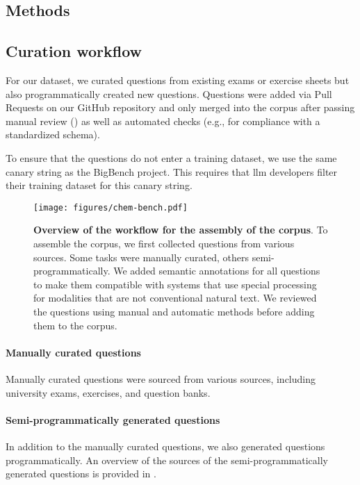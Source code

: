 \documentclass[11pt, oneside]{article}
\begin{document}
\begin{refsection}
\clearpage

\section{Methods}

\subsection{Curation workflow}\label{sec:curation}
For our dataset, we curated questions from existing exams or exercise sheets but also programmatically created new questions.
Questions were added via Pull Requests on our GitHub repository and only merged into the corpus after passing manual review () as well as automated checks (e.g., for compliance with a standardized schema).

To ensure that the questions do not enter a training dataset, we use the same canary string as the BigBench project.
This requires that \Gls{llm} developers filter their training dataset for this canary string.\autocite{openai2024gpt4, srivastava2022beyond}

\begin{figure}[!h]
    \texttt{[image: figures/chem-bench.pdf]}
    \caption{\textbf{Overview of the workflow for the assembly of the \chembench corpus}.
    To assemble the \chembench corpus, we first collected questions from various sources. Some tasks were manually curated, others semi-programmatically. We added semantic annotations for all questions to make them compatible with systems that use special processing for modalities that are not conventional natural text. We reviewed the questions using manual and automatic methods before adding them to the corpus.}
    \label{fig:curation_workflow}
\end{figure}

\paragraph{Manually curated questions}
Manually curated questions were sourced from various sources, including university exams, exercises, and question banks.

%



\paragraph{Semi-programmatically generated questions}
In addition to the manually curated questions, we also generated questions programmatically. An overview of the sources of the semi-programmatically generated questions is provided in .


\end{refsection}
\end{document}

